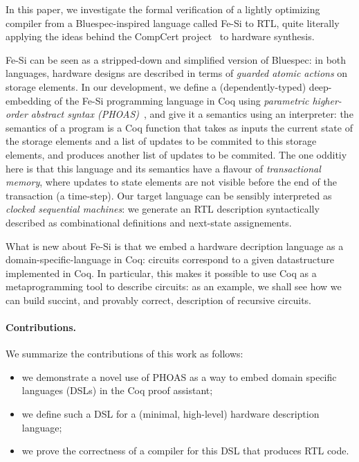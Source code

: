 \documentclass[preprint]{sigplanconf}
\newcommand{\project}{Fe-Si}
\begin{document}
\medskip In this paper, we investigate the formal verification of a
lightly optimizing compiler from a Bluespec-inspired language called
\project{} to RTL, quite literally applying the ideas behind the
CompCert project~\cite{Leroy-Compcert-CACM} to hardware synthesis.

\medskip

\project{} can be seen as a stripped-down and simplified version
of Bluespec: in both languages, hardware designs are described in
terms of \emph{guarded atomic actions} on storage elements. 
%
In our development, we define a (dependently-typed) deep-embedding of
the \project{} programming language in Coq using \emph{parametric
  higher-order abstract syntax (PHOAS)}~\cite{phoas-chlipala}, and
give it a semantics using an interpreter: the semantics of a program
is a Coq function that takes as inputs the current state of the
storage elements and a list of updates to be commited to this storage
elements, and produces another list of updates to be commited.
%
The one odditiy here is that this language and its semantics have a
flavour of \emph{transactional memory}, where updates to state
elements are not visible before the end of the transaction (a
time-step).
%
Our target language can be sensibly interpreted as \emph{clocked
  sequential machines}: we generate an RTL description syntactically
described as combinational definitions and next-state assignements.

\medskip

What is new about \project{} is that we embed a hardware decription
language as a domain-specific-language in Coq: circuits correspond to
a given datastructure implemented in Coq.
%
In particular, this makes it possible to use Coq as a metaprogramming
tool to describe circuits: as an example, we shall see how we can
build succint, and provably correct, description of recursive
circuits.



\paragraph{Contributions.}
We summarize the contributions of this work as follows:
\begin{itemize}
\item we demonstrate a novel use of PHOAS as a way to embed domain
  specific languages (DSLs) in the Coq proof assistant;
\item we define such a DSL for a (minimal, high-level) hardware
  description language;
\item we prove the correctness of a compiler for this DSL that
  produces RTL code. 
\end{itemize}
\end{document}
